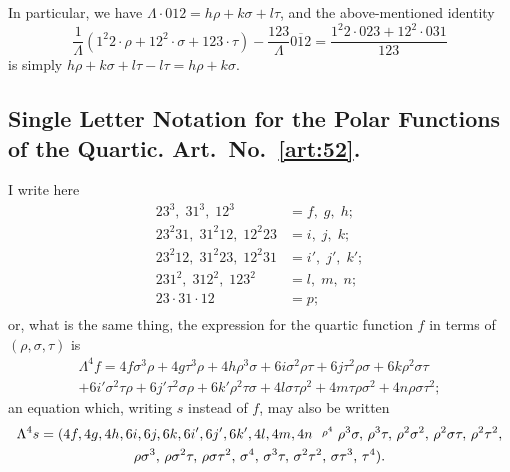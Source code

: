 \documentclass[11pt,a4paper]{book}
\begin{document}
\newpage
\begin{art}\label{art:51}
In particular, we have $\Lambda \cdot 012 = h\rho + k\sigma + l\tau$, and the above-mentioned identity
\[
\frac{1}{\Lambda}(1^2 2 \cdot \rho + 12^2 \cdot \sigma + 123 \cdot \tau) - \frac{123}{\Lambda}\overline{012} = \frac{1^2 2 \cdot 023 + 12^2 \cdot 031}{123}
\]
is simply $h\rho + k\sigma + l\tau - l\tau = h\rho + k\sigma$.
\end{art}

\subsection*{Single Letter Notation for the Polar Functions of the Quartic. Art.~No.~\ref{art:52}.}

\begin{art}\label{art:52}
I write here
\begin{align*}
23^3,\; 31^3,\; 12^3 &= f,\; g,\; h;\\
23^2 31,\; 31^2 12,\; 12^2 23 &= i,\; j,\; k;\\
23^2 12,\; 31^2 23,\; 12^2 31 &= i',\; j',\; k';\\
231^2,\; 312^2,\; 123^2 &= l,\; m,\; n;\\
23 \cdot 31 \cdot 12 &= p;\\
\end{align*}
or, what is the same thing, the expression for the quartic function $f$ in terms of $(\rho, \sigma, \tau)$ is
\begin{multline*}
\Lambda^4 f = 4f\sigma^3\rho + 4g\tau^3\rho + 4h\rho^3\sigma + 6i\sigma^2\rho\tau + 6j\tau^2\rho\sigma + 6k\rho^2\sigma\tau \\
+ 6i'\sigma^2\tau\rho + 6j'\tau^2\sigma\rho + 6k'\rho^2\tau\sigma + 4l\sigma\tau\rho^2 + 4m\tau\rho\sigma^2 + 4n\rho\sigma\tau^2;
\end{multline*}
an equation which, writing $s$ instead of $f$, may also be written
\begin{multline*}
\Lambda^4 s = (4f, 4g, 4h, 6i, 6j, 6k, 6i', 6j', 6k', 4l, 4m, 4n \,\,\,\, \raisebox{0.5ex}{\text{\scriptsize$\rho^4$}}\,\, \rho^3\sigma,\, \rho^3\tau,\, \rho^2\sigma^2,\, \rho^2\sigma\tau,\, \rho^2\tau^2,\\
\rho\sigma^3,\, \rho\sigma^2\tau,\, \rho\sigma\tau^2,\, \sigma^4,\, \sigma^3\tau,\, \sigma^2\tau^2,\, \sigma\tau^3,\, \tau^4).
\end{multline*}
\end{art}
\end{document}
